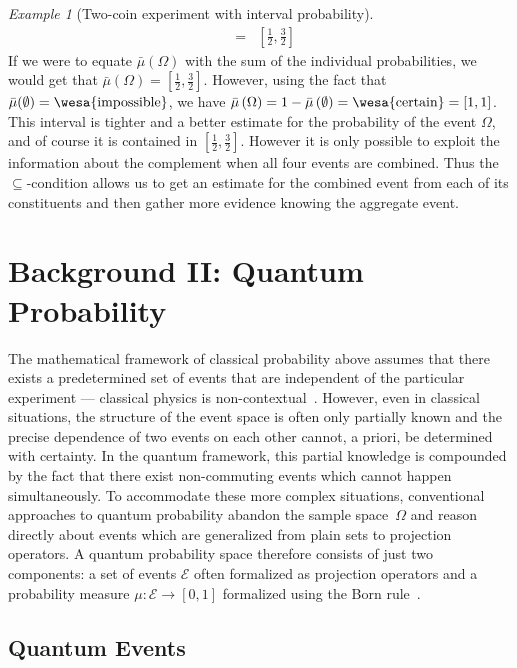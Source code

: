 \documentclass{article}
\theoremstyle{remark}
\newtheorem{example}{Example}
\newcommand{\qevents}{\ensuremath{\mathcal{E}}}
\newcommand{\imposs}{{\mbox{\wesa{impossible}}}}
\newcommand{\necess}{{\mbox{\wesa{certain}}}}
\begin{document}
\begin{example}[Two-coin experiment with interval probability]
\begin{eqnarray*}
&=& \left[\frac{1}{2},\frac{3}{2}\right]
\end{eqnarray*}
If we were to equate $\bar{\mu}(\Omega)$ with the sum of the individual
probabilities, we would get that $\bar{\mu}(\Omega)=\left[\frac{1}{2},\frac{3}{2}\right]$.
However, using the fact that $\bar{\mu}(\emptyset)=\imposs$, we have
$\bar{\mu}\left(\Omega\right)=1-\bar{\mu}\left(\emptyset\right)=\necess=[1,1]$.
This interval is tighter and a better estimate for the probability
of the event $\Omega$, and of course it is contained in $[\frac{1}{2},\frac{3}{2}]$.
However it is only possible to exploit the information about the complement
when all four events are combined. Thus the $\subseteq$-condition
allows us to get an estimate for the combined event from each of its
constituents and then gather more evidence knowing the aggregate
event.
\end{example}

\section{Background II: Quantum Probability}
 
The mathematical framework of classical probability above assumes that
there exists a predetermined set of events that are independent of the
particular experiment --- classical physics is
non-contextual~\cite{kochenspecker1967,Redhead1987-REDINA,peres1995quantum,Jaeger2007}. 
However, even in classical situations, the structure
of the event space is often only partially known and the precise
dependence of two events on each other cannot, a priori, be determined
with certainty. In the quantum framework, this partial knowledge is
compounded by the fact that there exist non-commuting events which
cannot happen simultaneously. To accommodate these more complex
situations, conventional approaches to quantum probability abandon the
sample space~$\Omega$ and reason directly about events which are
generalized from plain sets to projection operators. A quantum
probability space therefore consists of just two components: a set of
events $\qevents$ often formalized as projection operators and a
probability measure $\mu:\qevents\rightarrow[0,1]$ formalized using
the Born rule~\cite{Born1983,Mermin2007,Jaeger2007}.

\subsection{Quantum Events}
\end{document}
